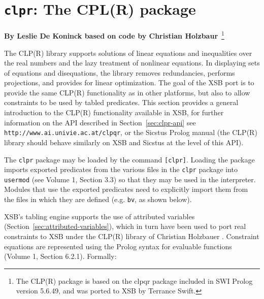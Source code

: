 \chapter{{\tt clpr}: The CPL(R) package}

\begin{center}
{\Large {\bf By Leslie De Koninck based on code by Christian
    Holzbaur}}~\footnote{The CLP(R) package is based on the clpqr
  package included in SWI Prolog version 5.6.49, and was ported to XSB
  by Terrance Swift.}
\end{center}

The CLP(R) library supports solutions of linear equations and
inequalities over the real numbers and the lazy treatment of nonlinear
equations.  In displaying sets of equations and disequations, the
library removes redundancies, performs projections, and provides for
linear optimization.  The goal of the XSB port is to provide the same
CLP(R) functionality as in other platforms, but also to allow
constraints to be used by tabled predicates.  This section provides a
general introduction to the CLP(R) functionality available in XSB, for
further information on the API described in Section~\ref{sec:clpr-api}
see {\tt http://www.ai.univie.ac.at/clpqr}, or the Sicstus Prolog
manual (the CLP(R) library should behave similarly on XSB and
Sicstus at the level of this API).

The {\tt clpr} package may be loaded by the command {\tt [clpr]}.
Loading the package imports exported predicates from the various files
in the {\tt clpr} package into {\tt usermod} (see Volume 1, Section
3.3) so that they may be used in the interpreter.  Modules that use
the exported predicates need to explicitly import them from the files
in which they are defined (e.g. {\tt bv}, as shown below).

XSB's tabling engine supports the use of attributed variables
(Section~\ref{sec:attributed-variables}), which in turn have been used
to port real constraints to XSB under the CLP(R) library of Christian
Holzbauer \cite{Holz95}.  Constraint equations are represented using
the Prolog syntax for evaluable functions (Volume 1, Section 6.2.1).
Formally:

